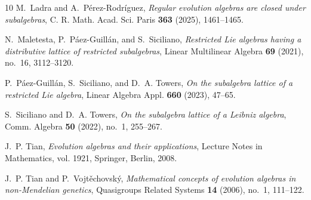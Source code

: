 \documentclass[12pt,reqno]{amsart}
\theoremstyle{plain}%
\theoremstyle{definition}
\theoremstyle{remark}
\numberwithin{equation}{section}
\begin{document}
\begin{thebibliography}{10}
	M.~Ladra and A.~P\'erez-Rodr\'iguez, \emph{Regular evolution algebras are
		closed under subalgebras}, C. R. Math. Acad. Sci. Paris \textbf{363} (2025),
	1461--1465.
	
	N.~Maletesta, P.~P\'aez-Guill\'an, and S.~Siciliano, \emph{Restricted {L}ie
		algebras having a distributive lattice of restricted subalgebras}, Linear
	Multilinear Algebra \textbf{69} (2021), no.~16, 3112--3120.
	
	P.~P\'aez-Guill\'an, S.~Siciliano, and D.~A. Towers, \emph{On the subalgebra
		lattice of a restricted {L}ie algebra}, Linear Algebra Appl. \textbf{660}
	(2023), 47--65.
	
	S.~Siciliano and D.~A. Towers, \emph{On the subalgebra lattice of a {L}eibniz
		algebra}, Comm. Algebra \textbf{50} (2022), no.~1, 255--267.
	
	J.~P. Tian, \emph{Evolution algebras and their applications}, Lecture Notes in
	Mathematics, vol. 1921, Springer, Berlin, 2008.
	
	J.~P. Tian and P.~Vojt{\v{e}}chovsk{\'y}, \emph{Mathematical concepts of
		evolution algebras in non-{M}endelian genetics}, Quasigroups Related Systems
	\textbf{14} (2006), no.~1, 111--122.
	
\end{thebibliography}
\end{document}
